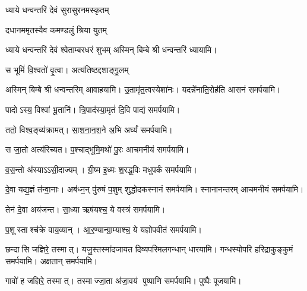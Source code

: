 \begin{center}

{ध्याये धन्वन्तरिं देवं सुरासुरनमस्कृतम्}

{दधानममृतस्यैव कमण्डलुं श्रिया युतम्}

{ध्याये धन्वन्तरिं देवं श्वेताम्बरधरं शुभम्}
अस्मिन् बिम्बे श्री धन्वन्तरिं ध्यायामि।
\medskip

{स भूमिं॑ वि॒श्वतो॑ वृ॒त्वा। अत्य॑तिष्ठद्दशाङ्गु॒लम्}

अस्मिन् बिम्बे श्री धन्वन्तरिम् आवाहयामि।
\medskip
{}
 {उ॒तामृ॑त॒त्वस्येशा॑नः। यदन्ने॑नाति॒रोह॑ति}
 आसनं समर्पयामि।\medskip

{पादोऽस्य॒ विश्वा॑ भू॒तानि॑। त्रि॒पाद॑स्या॒मृतं॑ दि॒वि}
 पाद्यं समर्पयामि।\medskip
 
{ततो॒ विश्व॒ङ्व्य॑क्रामत्। सा॒श॒ना॒न॒श॒ने अ॒भि}
 अर्घ्यं समर्पयामि।\medskip

{स जा॒तो अत्य॑रिच्यत। प॒श्चाद्भूमि॒मथो॑ पु॒रः}
 आचमनीयं समर्पयामि।\medskip

{व॒स॒न्तो अ॑स्याऽऽसी॒दाज्यम्। ग्री॒ष्म इ॒ध्मः श॒रद्ध॒विः}
मधुपर्कं समर्पयामि।\medskip

 {दे॒वा यद्य॒ज्ञं त॑न्वा॒नाः। अब॑ध्न॒न् पु॑रुषं प॒शुम्}
 शुद्धोदकस्नानं समर्पयामि। स्नानानन्तरम् आचमनीयं समर्पयामि।\medskip

 {तेन॑ दे॒वा अय॑जन्त। सा॒ध्या ऋष॑यश्च॒ ये}
 वस्त्रं समर्पयामि।\medskip

{प॒शूस्ताश्च॑क्रे वाय॒व्यान्। आ॒र॒ण्यान्ग्रा॒म्याश्च॒ ये}
 यज्ञोपवीतं समर्पयामि।\medskip

{छन्दासि जज्ञिरे॒ तस्मात्। यजु॒स्तस्मा॑दजायत}
 दिव्यपरिमलगन्धान् धारयामि। गन्धस्योपरि हरिद्राकुङ्कुमं समर्पयामि। अक्षतान् समर्पयामि।\medskip

{गावो॑ ह जज्ञिरे॒ तस्मात्। तस्माज्जा॒ता अ॑जा॒वय॑}
  पुष्पाणि समर्पयामि।  पुष्पैः पूजयामि।

\end{center}

